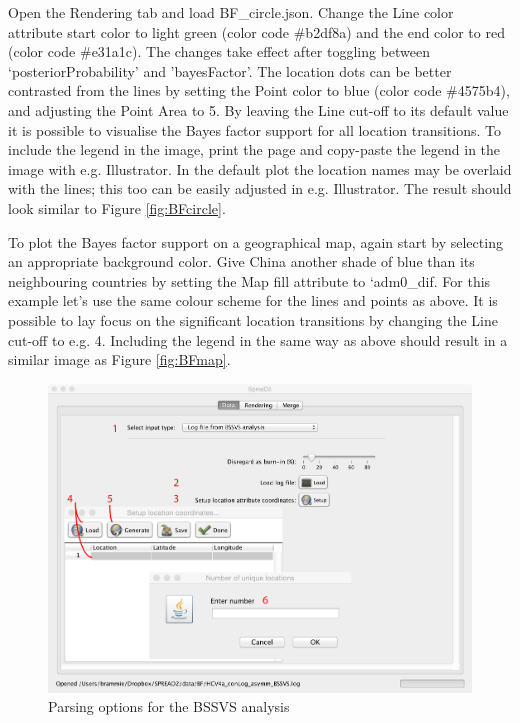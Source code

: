 \documentclass[english]{paper}
\begin{document}
Open the Rendering tab and load BF\_circle.json.
Change the Line color attribute start color to light green (color code \#b2df8a) and the end color to red (color code \#e31a1c).
The changes take effect after toggling between `posteriorProbability' and 'bayesFactor'.
The location dots can be better contrasted from the lines by setting the Point color to blue (color code \#4575b4), and adjusting the Point Area to 5. 
By leaving the Line cut-off to its default value it is possible to visualise the Bayes factor support for all location transitions.
To include the legend in the image, print the page and copy-paste the legend in the image with e.g. Illustrator. 
In the default plot the location names may be overlaid with the lines; this too can be easily adjusted in e.g. Illustrator.
The result should look similar to Figure \ref{fig:BFcircle}.
\par
To plot the Bayes factor support on a geographical map, again start by selecting an appropriate background color.
Give China another shade of blue than its neighbouring countries by setting the Map fill attribute to `adm0\_dif.
For this example let's use the same colour scheme for the lines and points as above. 
It is possible to lay focus on the significant location transitions by changing the Line cut-off to e.g. 4. 
Including the legend in the same way as above should result in a similar image as Figure \ref{fig:BFmap}.

\begin{figure}%
\centering
\includegraphics[width=1\textwidth]{./figures/Fig5_BFparse.pdf} %
\caption{Parsing options for the BSSVS analysis}
\label{fig:parseBF}
\end{figure}
\end{document}
